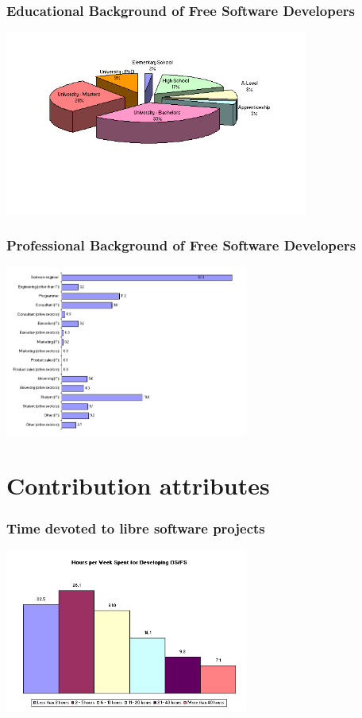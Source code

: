 \documentclass{beamer}
\begin{document}
\begin{frame}
\frametitle{Educational Background of Free Software Developers}

\begin{center}
\includegraphics[width=10cm]{figs/educational-background.png}
\end{center}

\end{frame}


\begin{frame}
\frametitle{Professional Background of Free Software Developers}

\begin{center}
\includegraphics[width=8cm]{figs/professional-background.png}
\end{center}

\end{frame}


\section{Contribution attributes}

\begin{frame}
\frametitle{Time devoted to libre software projects}

\begin{center}
\includegraphics[width=8cm]{figs/hours-week.png}
\end{center}

\end{frame}
\end{document}
